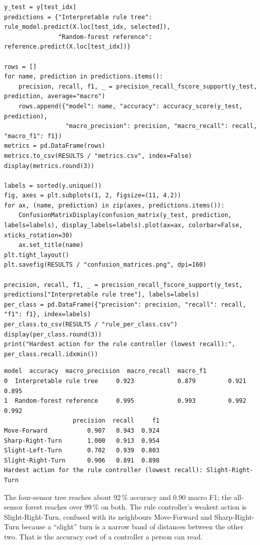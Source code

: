 \begin{labanswer}
\begin{lstlisting}[style=utppython]
y_test = y[test_idx]
predictions = {"Interpretable rule tree": rule_model.predict(X.loc[test_idx, selected]),
               "Random-forest reference": reference.predict(X.loc[test_idx])}

rows = []
for name, prediction in predictions.items():
    precision, recall, f1, _ = precision_recall_fscore_support(y_test, prediction, average="macro")
    rows.append({"model": name, "accuracy": accuracy_score(y_test, prediction),
                 "macro_precision": precision, "macro_recall": recall, "macro_f1": f1})
metrics = pd.DataFrame(rows)
metrics.to_csv(RESULTS / "metrics.csv", index=False)
display(metrics.round(3))

labels = sorted(y.unique())
fig, axes = plt.subplots(1, 2, figsize=(11, 4.2))
for ax, (name, prediction) in zip(axes, predictions.items()):
    ConfusionMatrixDisplay(confusion_matrix(y_test, prediction, labels=labels), display_labels=labels).plot(ax=ax, colorbar=False, xticks_rotation=30)
    ax.set_title(name)
plt.tight_layout()
plt.savefig(RESULTS / "confusion_matrices.png", dpi=160)

precision, recall, f1, _ = precision_recall_fscore_support(y_test, predictions["Interpretable rule tree"], labels=labels)
per_class = pd.DataFrame({"precision": precision, "recall": recall, "f1": f1}, index=labels)
per_class.to_csv(RESULTS / "rule_per_class.csv")
display(per_class.round(3))
print("Hardest action for the rule controller (lowest recall):", per_class.recall.idxmin())
\end{lstlisting}
\expectedoutput
\begin{lstlisting}[style=utpterminal]
                     model  accuracy  macro_precision  macro_recall  macro_f1
0  Interpretable rule tree     0.923            0.879         0.921     0.895
1  Random-forest reference     0.995            0.993         0.992     0.992
                   precision  recall     f1
Move-Forward           0.907   0.943  0.924
Sharp-Right-Turn       1.000   0.913  0.954
Slight-Left-Turn       0.702   0.939  0.803
Slight-Right-Turn      0.906   0.891  0.898
Hardest action for the rule controller (lowest recall): Slight-Right-Turn
\end{lstlisting}
The four-sensor tree reaches about 92\,\% accuracy and 0.90 macro F1; the all-sensor forest reaches over 99\,\% on both. The rule controller's weakest action is Slight-Right-Turn, confused with its neighbours Move-Forward and Sharp-Right-Turn because a ``slight'' turn is a narrow band of distances between the other two. That is the accuracy cost of a controller a person can read.
\end{labanswer}

